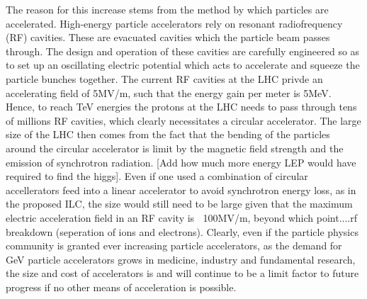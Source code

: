 \indent The reason for this increase stems from the method by which particles are accelerated. High-energy particle accelerators rely on resonant radiofrequency (RF) cavities. These are evacuated cavities which the particle beam passes through. The design and operation of these cavities are carefully engineered so as to set up an oscillating electric potential which acts to accelerate and squeeze the particle bunches together. The current RF cavities at the LHC privde an accelerating field of 5MV/m, such that the energy gain per meter is 5MeV. Hence, to reach TeV energies the protons at the LHC needs to pass through tens of millions RF cavities, which clearly necessitates a circular accelerator. The large size of the LHC then comes from the fact that the bending of the particles around the circular accelerator is limit by the magnetic field strength and the emission of synchrotron radiation.  [Add how much more energy LEP would have required to find the higgs]. Even if one used a combination of circular accellerators feed into a linear accelerator to avoid synchrotron energy loss, as in the proposed ILC, the size would still need to be large given that the maximum electric acceleration field in an RF cavity is $~$ 100MV/m, beyond which point....rf breakdown (seperation of ions and electrons). Clearly, even if the particle physics community is granted ever increasing particle accelerators, as the demand for GeV particle accelerators grows in medicine, industry and fundamental research, the size and cost of accelerators is and will continue to be a limit factor to future progress if no other means of acceleration is possible.\vspace{-8pt}
